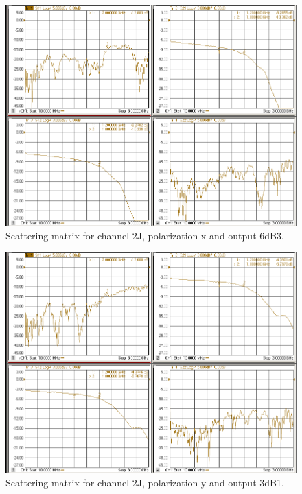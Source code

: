 \documentclass[12pt,a4paper,oneside]{article}
\begin{document}
\begin{figure}[H]
\centering
\includegraphics[width=0.9\linewidth]{VNA_results/2Jx_6dB3.png}
\caption{Scattering matrix for channel 2J, polarization x and output 6dB3.}
\label{fig:2Jx_6dB3}
\end{figure}


\begin{figure}[H]
\centering
\includegraphics[width=0.9\linewidth]{VNA_results/2Jy_3dB1.png}
\caption{Scattering matrix for channel 2J, polarization y and output 3dB1.}
\label{fig:2Jy_3dB1}
\end{figure}
\end{document}
